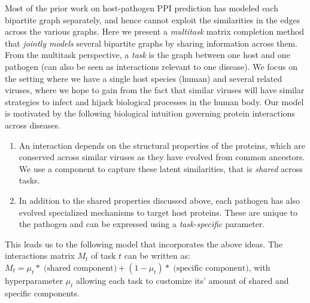 \documentclass[runningheads,a4paper]{llncs}
\begin{document}
Most of the prior work on host-pathogen PPI prediction has modeled each bipartite graph separately, and hence cannot exploit the similarities 
in the edges across the various graphs. Here we present a \textit{multitask} matrix completion method that \textit{jointly models} 
several bipartite graphs by sharing information across them. 
From the multitask perspective, a \textit{task} is the graph between one host and one pathogen (can also be seen as interactions relevant to one disease). 
We focus on the setting where we have a single host species (human) and several related viruses, where we hope to gain from the 
fact that similar viruses will have similar strategies to infect and hijack biological processes in the human body.
Our model is motivated by the following biological intuition governing protein interactions across diseases.
\begin{enumerate}
\item An interaction depends on the structural properties of the proteins, which are conserved across similar viruses as they have evolved from common ancestors. We use a component to capture these latent similarities, that is \textit{shared} across tasks.
\item In addition to the shared properties discussed above, each pathogen has also evolved specialized mechanisms to target host proteins. These are unique to the pathogen and can be expressed using a \textit{task-specific} parameter.
\end{enumerate}

This leads us to the following model that incorporates the above ideas. The interactions matrix $M_t$ of task $t$ can be written as: $M_t = \mu_t *\; \textrm{(shared component)} + (1-\mu_t) *\; \textrm{(specific component)} $, with hyperparameter $\mu_t$ allowing each task to customize its' amount of shared and specific components.
\end{document}
